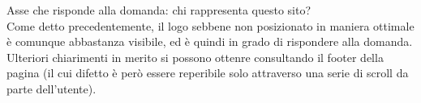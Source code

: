 Asse che risponde alla domanda: chi rappresenta questo sito?  \\
Come detto precedentemente, il logo sebbene non posizionato in maniera ottimale è comunque abbastanza visibile, ed è quindi in grado di rispondere alla domanda. \\
Ulteriori chiarimenti in merito si possono ottenre consultando il footer della pagina (il cui difetto è però essere reperibile solo attraverso una serie di scroll da parte dell'utente).